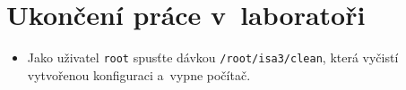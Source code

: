 \documentclass[a4paper,11pt]{article}
\begin{document}
\begin{enumerate}
\end{enumerate}

\section{Ukončení práce v~laboratoři}
\begin{itemize}
  \item Jako uživatel {\tt root} spusťte dávkou {\tt /root/isa3/clean}, která vyčistí vytvořenou konfiguraci a~vypne počítač.
\end{itemize}
\end{document}

